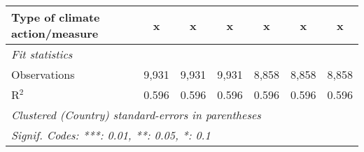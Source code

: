\begin{tabular}{lcccccc}
   Type of climate action/measure                   & x       & x       & x       & x            & x            & x\\  
   \midrule \emph{Fit statistics}\\
   Observations                                     & 9,931   & 9,931   & 9,931   & 8,858        & 8,858        & 8,858\\  
   R$^2$                                            & 0.596   & 0.596   & 0.596   & 0.596        & 0.596        & 0.596\\  
   \midrule
   \multicolumn{7}{l}{\emph{Clustered (Country) standard-errors in parentheses}}\\
   \multicolumn{7}{l}{\emph{Signif. Codes: ***: 0.01, **: 0.05, *: 0.1}}\\
\end{tabular}
\par\endgroup


